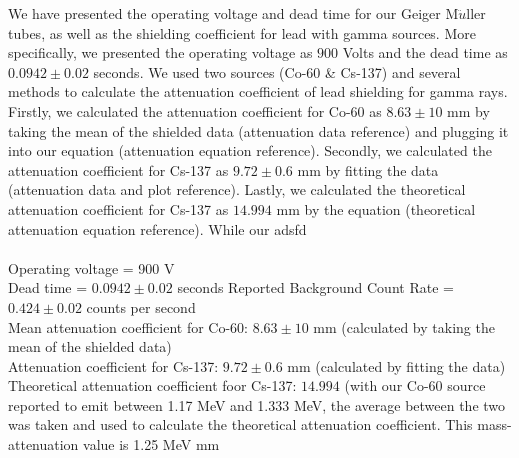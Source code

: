 We have presented the operating voltage and dead time for our Geiger M$\ddot{u}$ller tubes, as well as the shielding coefficient for lead with gamma sources. More specifically, we presented the operating voltage as $900$ Volts and the dead time as $0.0942 \pm 0.02$ seconds. We used two sources (Co-60 \& Cs-137) and several methods to calculate the attenuation coefficient of lead shielding for gamma rays. Firstly, we calculated the attenuation coefficient for Co-60 as $8.63 \pm 10$ mm by taking the mean of the shielded data (attenuation data reference) and plugging it into our equation (attenuation equation reference). Secondly, we calculated the attenuation coefficient for Cs-137 as $9.72 \pm 0.6$ mm by fitting the data (attenuation data and plot reference). Lastly, we calculated the theoretical attenuation coefficient for Cs-137 as $14.994$ mm by the equation (theoretical attenuation equation reference). While our adsfd
\\ \\
Operating voltage = 900 V \\
Dead time = $0.0942 \pm 0.02$ seconds
Reported Background Count Rate  = $0.424 \pm 0.02$ counts per second \\ 
Mean attenuation coefficient for Co-60: $8.63 \pm 10$ mm (calculated by taking the mean of the shielded data) \\
Attenuation coefficient for Cs-137: $9.72 \pm 0.6$ mm (calculated by fitting the data) \\
Theoretical attenuation coefficient foor Cs-137: $14.994$ (with our Co-60 source reported to emit between 1.17 MeV and 1.333 MeV, the average between the two was taken and used to calculate the theoretical attenuation coefficient. This mass-attenuation value is 1.25 MeV mm